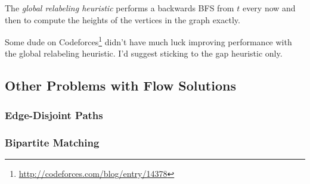 The \textit{global relabeling heuristic} performs a backwards BFS from $t$ every now and then to compute the heights of the vertices in the graph exactly.

Some dude on Codeforces\footnote{\url{http://codeforces.com/blog/entry/14378}} didn't have much luck improving performance with the global relabeling heuristic. I'd suggest sticking to the gap heuristic only.

\subsection{Other Problems with Flow Solutions}

\subsubsection{Edge-Disjoint Paths}

\subsubsection{Bipartite Matching}
